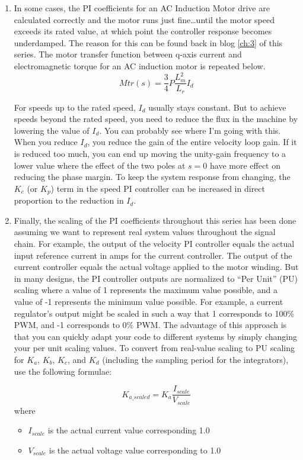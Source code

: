 \begin{enumerate}
    \item In some cases, the PI coefficients for an AC Induction Motor drive are calculated correctly and the motor runs just fine\dots until the motor speed exceeds its rated value, at which point the controller response becomes underdamped.  The reason for this can be found back in blog \ref{ch:3} of this series.  The motor transfer function between q-axis current and electromagnetic torque for an AC induction motor is repeated below.
    \begin{equation}
        Mtr(s) = \frac34 P \frac{L_m^2}{L_r}I_d
    \end{equation}

    For speeds up to the rated speed, $I_d$ usually stays constant.  But to achieve speeds beyond the rated speed, you need to reduce the flux in the machine by lowering the value of $I_d$.  You can probably see where I’m going with this.  When you reduce $I_d$, you reduce the gain of the entire velocity loop gain.  If it is reduced too much, you can end up moving the unity-gain frequency to a lower value where the effect of the two poles at $s=0$ have more effect on reducing the phase margin.  To keep the system response from changing, the $K_c$ (or $K_p$) term in the speed PI controller can be increased in direct proportion to the reduction in $I_d$.

    \item Finally, the scaling of the PI coefficients throughout this series has been done assuming we want to represent real system values throughout the signal chain.  For example, the output of the velocity PI controller equals the actual input reference current in amps for the current controller.  The output of the current controller equals the actual voltage applied to the motor winding.  But in many designs, the PI controller outputs are normalized to “Per Unit” (PU) scaling where a value of 1 represents the maximum value possible, and a value of -1 represents the minimum value possible.  For example, a current regulator’s output might be scaled in such a way that 1 corresponds to 100\% PWM, and -1 corresponds to 0\% PWM.  The advantage of this approach is that you can quickly adapt your code to different systems by simply changing your per unit scaling values.  To convert from real-value scaling to PU scaling for $K_a$, $K_b$, $K_c$, and $K_d$ (including the sampling period for the integrators), use the following formulae:

    \begin{equation}
        K_{a\_scaled} = K_a \frac{I_{scale}}{V_{scale}}
    \end{equation}
    where
    \begin{itemize}
        \item $I_{scale}$ is the actual current value corresponding \num{1.0}
        \item $V_{scale}$ is the actual voltage value corresponding to \num{1.0}
    \end{itemize}


\end{enumerate}
